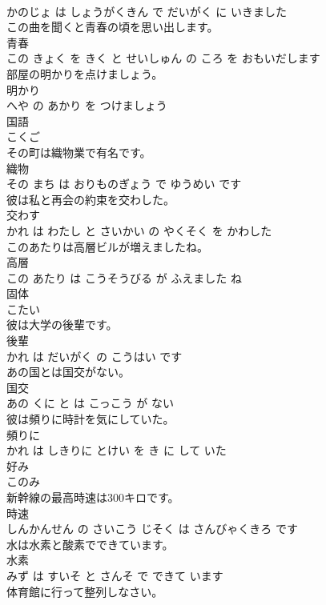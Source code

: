 \documentclass[8pt]{extreport}
\begin{document}
\begin{CJK}{UTF8}{min}
\\	かのじょ は しょうがくきん で だいがく に いきました			
\\	この曲を聞くと青春の頃を思い出します。	
\\	青春 
\\	この きょく を きく と せいしゅん の ころ を おもいだします			
\\	部屋の明かりを点けましょう。	
\\	明かり 
\\	へや の あかり を つけましょう			
\\	国語	
\\	こくご		
\\	その町は織物業で有名です。	
\\	織物 
\\	その まち は おりものぎょう で ゆうめい です			
\\	彼は私と再会の約束を交わした。	
\\	交わす 
\\	かれ は わたし と さいかい の やくそく を かわした			
\\	このあたりは高層ビルが増えましたね。	
\\	高層 
\\	この あたり は こうそうびる が ふえました ね			
\\	固体	
\\	こたい		
\\	彼は大学の後輩です。	
\\	後輩 
\\	かれ は だいがく の こうはい です			
\\	あの国とは国交がない。	
\\	国交 
\\	あの くに と は こっこう が ない			
\\	彼は頻りに時計を気にしていた。	
\\	頻りに 
\\	かれ は しきりに とけい を き に して いた			
\\	好み	
\\	このみ		
\\	新幹線の最高時速は300キロです。	
\\	時速 
\\	しんかんせん の さいこう じそく は さんびゃくきろ です			
\\	水は水素と酸素でできています。	
\\	水素 
\\	みず は すいそ と さんそ で できて います			
\\	体育館に行って整列しなさい。	

\end{CJK}
\end{document}
